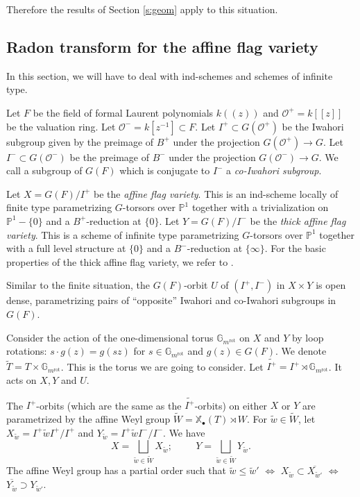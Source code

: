 \documentclass{amsart}
\theoremstyle{plain}
\theoremstyle{definition}
\theoremstyle{remark}
\numberwithin{equation}{subsection}
\begin{document}
Therefore the results of Section \ref{s:geom} apply to this situation.

\subsection{Radon transform for the affine flag variety}\label{ss:aff}
In this section, we will have to deal with ind-schemes and schemes of infinite type.

Let $F$ be the field of formal Laurent polynomials $k((z))$ and ${\mathcal{O}}^+=k[[z]]$ be the valuation ring. Let ${\mathcal{O}}^-=k[z^{-1}]\subset F$. Let $I^+\subset G({\mathcal{O}}^+)$ be the Iwahori subgroup given by the preimage of $B^+$ under the projection $G({\mathcal{O}}^+)\to G$. Let $I^-\subset G({\mathcal{O}}^-)$ be the preimage of $B^-$ under the projection $G({\mathcal{O}}^-)\to G$. We call a subgroup of $G(F)$ which is conjugate to $I^-$ a {\em co-Iwahori subgroup}. 

Let $X=G(F)/I^+$ be the {\em affine flag variety}. This is an ind-scheme locally of finite type parametrizing $G$-torsors over ${\mathbb{P}}^1$ together with a trivialization on ${\mathbb{P}}^1-\{0\}$ and a $B^+$-reduction at $\{0\}$. Let $Y=G(F)/I^-$ be the {\em thick affine flag variety}. This is a scheme of infinite type parametrizing $G$-torsors over ${\mathbb{P}}^1$ together with a full level structure at $\{0\}$ and a $B^-$-reduction at $\{\infty\}$. For the basic properties of the thick affine flag variety, we refer to \cite{Ka}.

Similar to the finite situation, the $G(F)$-orbit $U$ of $(I^+,I^-)$ in $X\times Y$ is open dense, parametrizing pairs of ``opposite'' Iwahori and co-Iwahori subgroups in $G(F)$. 

Consider the action of the one-dimensional torus ${\mathbb{G}}_m^\operatorname{rot}$ on $X$ and $Y$ by loop rotations: $s\cdot g(z)=g(sz)$ for $s\in{\mathbb{G}}_m^\operatorname{rot}$ and $g(z)\in G(F)$. We denote ${\widetilde{T}}=T\times{\mathbb{G}}_m^\operatorname{rot}$. This is the torus we are going to consider. Let ${\widetilde{I^+}}=I^+\rtimes{\mathbb{G}}_m^\operatorname{rot}$. It acts on $X,Y$ and $U$.

The $I^+$-orbits (which are the same as the ${\widetilde{I^+}}$-orbits) on either $X$ or $Y$ are parametrized by the affine Weyl group ${\widetilde{W}}={\mathbb{X}_\bullet}(T)\rtimes W$. For ${\widetilde{w}}\in{\widetilde{W}}$, let $X_{\widetilde{w}}=I^+{\widetilde{w}} I^+/I^+$ and $Y_{\widetilde{w}}=I^+{\widetilde{w}} I^-/I^-$. We have
\begin{equation*}
X=\bigsqcup_{{\widetilde{w}}\in {\widetilde{W}}}X_{\widetilde{w}};\hspace{1cm}Y=\bigsqcup_{{\widetilde{w}}\in {\widetilde{W}}}Y_{\widetilde{w}}.
\end{equation*}
The affine Weyl group has a partial order such that ${\widetilde{w}}\leq{\widetilde{w}}'$ $\Leftrightarrow$ $X_{\widetilde{w}}\subset\overline{X_{{\widetilde{w}}'}}$ $\Leftrightarrow$ $\overline{Y_{\widetilde{w}}}\supset Y_{{\widetilde{w}}'}$.
\end{document}
